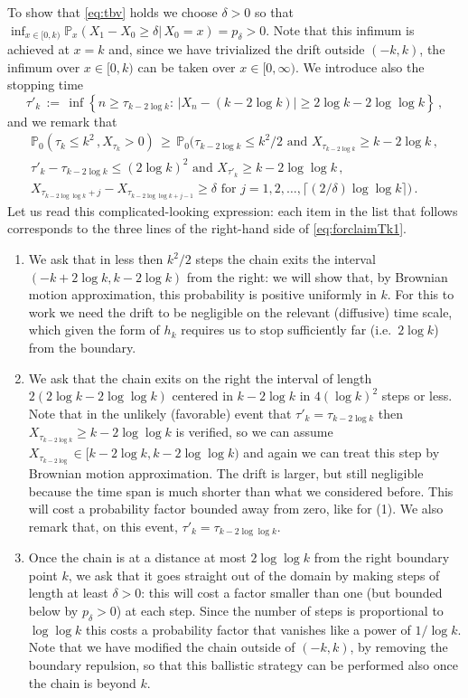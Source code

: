 \documentclass[reqno,11pt]{amsart}
\numberwithin{equation}{section}
\newcommand{\bbP}{{\ensuremath{\mathbb P}} }
\newcommand{\gd}{\delta}
\begin{document}
To show that  \eqref{eq:tbv} holds we choose 
$\gd>0$ so that $\inf_{x\in[0,k)}\bbP_x( X_1-X_0 \ge \gd \vert \, X_0 =x) =p_\gd>0$. Note that this infimum 
is achieved at $x=k$ and, since we have trivialized the drift outside $(-k,k)$, the infimum over $x\in[0,k)$ can be taken over $x \in [0, \infty)$.   We introduce also the stopping time
\begin{equation}
\tau'_k\, :=\, \inf \left\{ n\ge \tau_{k- 2 \log k}: \, \vert X_n-(k- 2 \log k) \vert \ge 2 \log k - 2 \log \log k \right\}\, ,
\end{equation}
and we 
remark that
\begin{multline}
\label{eq:forclaimTk1}
\bbP_0\left( \tau_k \le k^2\, , X_{\tau_k} >0\right) \, \ge \, 
\bbP_0\Big( \tau_{k- 2 \log k} \le  k^2 /2 \textrm { and } X_{ \tau_{k- 2 \log k}} \ge  k- 2 \log k
\, , \\
\tau'_k-\tau_{k-2 \log k} \le (2 \log k)^2 \text{ and } X_{\tau'_k} \ge k-2 \log \log k
\, ,
\\
X_{\tau_{k- 2 \log \log k}+j}- X_{\tau_{k- 2 \log \log k +j-1} }\ge \gd \textrm{ for } j=1, 2, \ldots, \lceil (2/ \gd) \log \log k\rceil
\Big)\, .
\end {multline}
Let us read  this  complicated-looking expression: each item in the list that follows corresponds to the three lines 
of the right-hand side of \eqref{eq:forclaimTk1}.
\begin{enumerate}
\item  We ask that in less then $k^2/2$ steps the chain exits the interval $(-k+2 \log k,k-2 \log k)$ from the right: we will show that, by Brownian motion approximation,
this probability is positive uniformly in $k$. 
For this to work we need the drift to be negligible on the relevant (diffusive) time scale, which given the form of $h_k$ requires us to stop sufficiently far  (i.e.\ $2 \log k$) from the boundary.
\item 
We ask that  the chain exits on the right the interval of length $2(2 \log k - 2 \log \log k)$
centered in $k- 2 \log k$ in  $4 (\log k)^2$ steps or less. 
Note that in the unlikely (favorable) event that  $\tau'_k=\tau_{k-2 \log k}$ then 
$X_{\tau_{k- 2 \log  k}}\ge k -2 \log \log k$  is verified, so we can assume  
$X_{\tau_{k- 2 \log} }\in [k-2\log k,  k-2 \log \log k)$ and 
again we can treat this step by Brownian motion approximation. The drift is larger, but still negligible because the time span is much shorter than what we considered before. This will cost a probability factor bounded away from zero, like for (1).
We also remark that, on this event, $\tau'_k=\tau_{k-2 \log \log k}$.
\item  Once the chain is at a distance at most $2 \log \log k$ from the right boundary point $k$, we ask that it goes straight out of the domain by making steps of length at least $\gd>0$: 
this will cost a factor smaller than one (but bounded below by $p_\gd>0$) at each step. Since the number of steps is proportional to 
$\log \log k$ this costs a probability factor that vanishes like a power of $1/ \log k$. Note that we have modified the chain outside of $(-k,k)$, by removing the boundary repulsion, so that this ballistic strategy can be performed also once the chain is beyond $k$.   
\end{enumerate}
\end{document}
